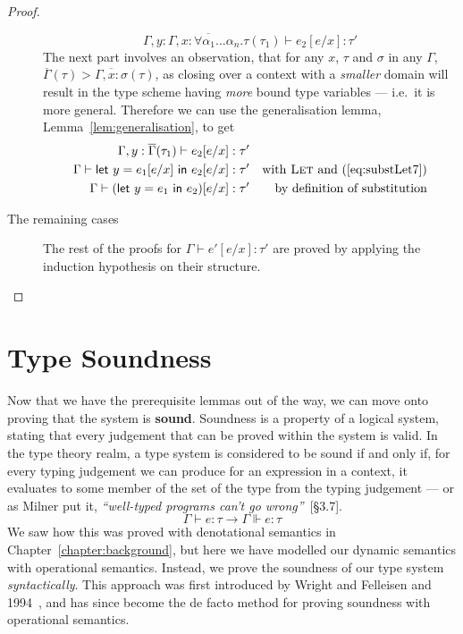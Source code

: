 \begin{proof}
\begin{description}
  \[ \Gamma , y : \overline{\Gamma, x : \forall\alpha_1\ldots\alpha_n.\tau}(\tau_1) \vdash e_2 [e/x] : \tau' \]
  The next part involves an observation, that for any $x$, $\tau$ and $\sigma$ in
  any $\Gamma$, ${\overline{\Gamma}(\tau) > \overline{\Gamma, x : \sigma}(\tau)}$, as closing
  over a context with a \textit{smaller} domain will result in the
  type scheme having \textit{more} bound type variables --- i.e.\ it is
  more general. Therefore we can use the generalisation lemma,
  Lemma~\ref{lem:generalisation}, to get
  \begin{align*}
    \Gamma , y : \overline{\Gamma}(\tau_1) \vdash e_2[e/x] : \tau' \\
    \Gamma \vdash \mathsf{let} \ y = e_1[e/x] \ \mathsf{in} \ e_2[e/x] : \tau' && \text{with \textsc{Let}
                                               and
                                               (\ref{eq:substLet7})}
    \\
    \Gamma \vdash (\mathsf{let} \ y = e_1 \ \mathsf{in} \ e_2)[e/x] : \tau' && \text{by definition of substitution}
  \end{align*}
  
  \item[The remaining cases] The rest of the proofs for $\Gamma \vdash e'[e/x] :
    \tau'$ are proved by applying the induction hypothesis on their structure.
  \end{description}
\end{proof}

\section{Type Soundness}\label{sec:type-soundness}

Now that we have the prerequisite lemmas out of the way, we can move
onto proving that the system is \textbf{sound}. Soundness is a
property of a logical system, stating that every judgement that can be
proved within the system is valid. In the type theory realm, a type
system is considered to be sound if and only if, for every typing
judgement we can produce for an expression in a context, it evaluates
to some member of the set of the type from the typing judgement --- or
as Milner put it, \textsl{``well-typed programs can't go
  wrong''}~\cite{milner1978}[§3.7].
\[\Gamma \vdash e : \tau \rightarrow \Gamma \Vdash e : \tau\]
We saw how this was proved with denotational semantics in
Chapter~\ref{chapter:background}, but here we have modelled our
dynamic semantics with operational semantics.  Instead, we prove the
soundness of our type system \textit{syntactically}. This approach was
first introduced by Wright and Felleisen and 1994~\cite{wright1994},
and has since become the de facto method for proving soundness
with operational semantics.


